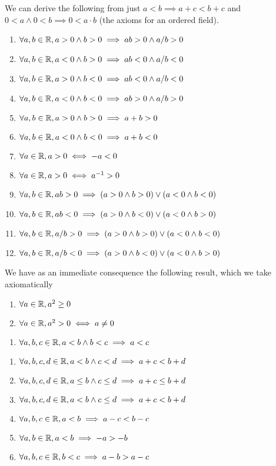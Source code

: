 We can derive the following from just $a<b\implies a+c<b+c$ and
$0<a\land 0<b\implies 0<a\cdot b$ (the axioms for an ordered field).
\begin{enumerate}[resume*]
\item $\forall a,b\in\mathbb{R}, a>0\land b>0\implies ab>0\land a/b>0$
\item $\forall a,b\in\mathbb{R}, a<0\land b>0\implies ab<0\land a/b<0$
\item $\forall a,b\in\mathbb{R}, a>0\land b<0\implies ab<0\land a/b<0$
\item $\forall a,b\in\mathbb{R}, a<0\land b<0\implies ab>0\land a/b>0$
\item $\forall a,b\in\mathbb{R}, a>0\land b>0\implies a+b>0$
\item $\forall a,b\in\mathbb{R}, a<0\land b<0\implies a+b<0$
\item $\forall a\in\mathbb{R}, a>0\iff -a<0$
\item $\forall a\in\mathbb{R}, a>0\iff a^{-1}>0$
\item $\forall a,b\in\mathbb{R}, ab>0\implies (a>0\land b>0)\lor(a<0\land b<0)$
\item $\forall a,b\in\mathbb{R}, ab<0\implies (a>0\land b<0)\lor(a<0\land b>0)$
\item $\forall a,b\in\mathbb{R}, a/b>0\implies (a>0\land b>0)\lor(a<0\land b<0)$
\item $\forall a,b\in\mathbb{R}, a/b<0\implies (a>0\land b<0)\lor(a<0\land b>0)$
\end{enumerate}

\M
We have as an immediate consequence the following result, which we take axiomatically
\begin{enumerate}[resume*]
\item $\forall a\in\mathbb{R}, a^{2}\geq0$
\item $\forall a\in\mathbb{R}, a^{2}>0\iff a\neq0$
\end{enumerate}

\begin{enumerate}[resume*]
\item $\forall a,b,c\in\mathbb{R},a<b\land b<c\implies a<c$
\end{enumerate}

\begin{enumerate}[resume*]
\item $\forall a,b,c,d\in\mathbb{R}, a<b\land c<d\implies a+c<b+d$
\item $\forall a,b,c,d\in\mathbb{R}, a\leq b\land c\leq d\implies a+c\leq b+d$
\item $\forall a,b,c,d\in\mathbb{R}, a<b\land c\leq d\implies a+c< b+d$
\item $\forall a,b,c\in\mathbb{R}, a<b\implies a-c < b-c$
\item $\forall a,b\in\mathbb{R}, a<b\implies -a > -b$
\item $\forall a,b,c\in\mathbb{R}, b<c\implies a-b > a-c$
\end{enumerate}

